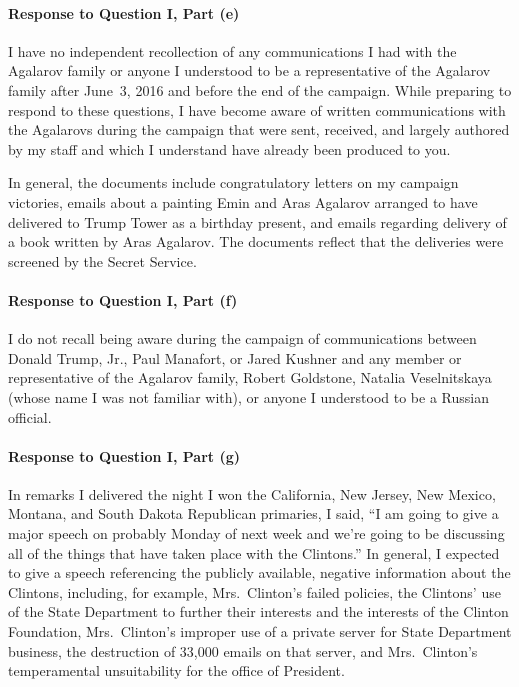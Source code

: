\paragraph*{Response to Question I, Part (e)}

I have no independent recollection of any communications I had with the Agalarov family or anyone I understood to be a representative of the Agalarov family after June~3, 2016 and before the end of the campaign.
While preparing to respond to these questions, I have become aware of written communications with the Agalarovs during the campaign that were sent, received, and largely authored by my staff and which I understand have already been produced to you.

In general, the documents include congratulatory letters on my campaign victories, emails about a painting Emin and Aras Agalarov arranged to have delivered to Trump Tower as a birthday present, and emails regarding delivery of a book written by Aras Agalarov.
The documents reflect that the deliveries were screened by the Secret Service.

\paragraph*{Response to Question I, Part (f)}

I do not recall being aware during the campaign of communications between Donald Trump, Jr., Paul Manafort, or Jared Kushner and any member or representative of the Agalarov family, Robert Goldstone, Natalia Veselnitskaya (whose name I was not familiar with), or anyone I understood to be a Russian official.

\paragraph*{Response to Question I, Part (g)}

In remarks I delivered the night I won the California, New Jersey, New Mexico, Montana, and South Dakota Republican primaries, I said, ``I am going to give a major speech on probably Monday of next week and we're going to be discussing all of the things that have taken place with the Clintons.''
In general, I expected to give a speech referencing the publicly available, negative information about the Clintons, including, for example, Mrs.~Clinton's failed policies, the Clintons' use of the State Department to further their interests and the interests of the Clinton Foundation, Mrs.~Clinton's improper use of a private server for State Department business, the destruction of 33,000 emails on that server, and Mrs.~Clinton's temperamental unsuitability for the office of President.

